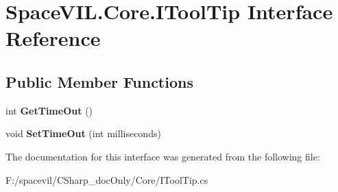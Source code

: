 \hypertarget{interface_space_v_i_l_1_1_core_1_1_i_tool_tip}{}\section{Space\+V\+I\+L.\+Core.\+I\+Tool\+Tip Interface Reference}
\label{interface_space_v_i_l_1_1_core_1_1_i_tool_tip}
\subsection*{Public Member Functions}
\begin{DoxyCompactItemize}
\item 
\mbox{\label{interface_space_v_i_l_1_1_core_1_1_i_tool_tip_a73ee0bb241ccaf98612a0386492bcfbc}} 
int {\bfseries Get\+Time\+Out} ()
\item 
\mbox{\label{interface_space_v_i_l_1_1_core_1_1_i_tool_tip_ae01bc76b6ce59de09786bbc81696e6c7}} 
void {\bfseries Set\+Time\+Out} (int milliseconds)
\end{DoxyCompactItemize}


The documentation for this interface was generated from the following file\+:\begin{DoxyCompactItemize}
\item 
F\+:/spacevil/\+C\+Sharp\+\_\+doc\+Only/\+Core/I\+Tool\+Tip.\+cs\end{DoxyCompactItemize}
